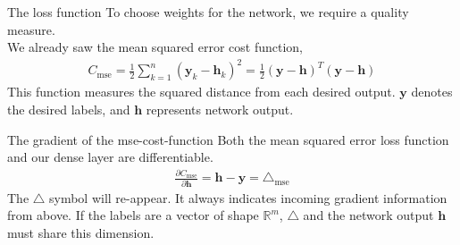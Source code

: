 \documentclass[notes]{beamer}
\begin{document}
    \begin{frame}{The loss function}
      To choose weights for the network, we require a quality measure. \\
      We already saw the mean squared error cost function,
      \begin{align}
        C_{\text{mse}} = \frac{1}{2} \sum_{k=1}^{n} (\mathbf{y}_k - \mathbf{h}_k)^2 = \frac{1}{2} (\mathbf{y} - \mathbf{h})^T(\mathbf{y} - \mathbf{h})
      \end{align}
      This function measures the squared distance from each desired output.
      $\mathbf{y}$ denotes the desired labels, and $\mathbf{h}$ represents network output.
    \end{frame}


    \begin{frame}{The gradient of the mse-cost-function}
      Both the mean squared error loss function and our dense layer are differentiable. 
      \begin{align}
        \frac{\partial C_{\text{mse}}}{\partial \mathbf{h}} = \mathbf{h} - \mathbf{y} = \triangle_{\text{mse}}
      \end{align}
      The $\triangle$ symbol will re-appear. It always indicates incoming gradient information from above.
      If the labels are a vector of shape $\mathbb{R}^m$, $\triangle$ and the network output $\mathbf{h}$ must share 
      this dimension.
    \end{frame}
\end{document}
